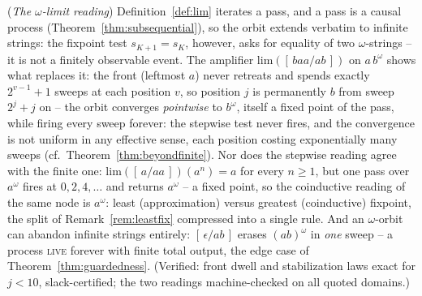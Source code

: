 
\begin{remark}
    (\emph{The $\omega$-limit reading})
    \label{rem:omega}
    Definition~\ref{def:lim} iterates a pass, and a pass is a causal
    process (Theorem~\ref{thm:subsequential}), so the orbit extends
    verbatim to infinite strings: the fixpoint test $s_{K+1} = s_K$,
    however, asks for equality of two $\omega$-strings -- it is not a
    finitely observable event.  The amplifier
    $\mathrm{lim}([\,baa/ab\,])$ on $a\,b^{\omega}$ shows what replaces
    it: the front (leftmost $a$) never retreats and spends exactly
    $2^{v-1}+1$ sweeps at each position $v$, so position $j$ is
    permanently $b$ from sweep $2^{j}+j$ on -- the orbit converges
    \emph{pointwise} to $b^{\omega}$, itself a fixed point of the pass,
    while firing every sweep forever: the stepwise test never fires,
    and the convergence is not uniform in any effective sense, each
    position costing exponentially many sweeps
    (cf.~Theorem~\ref{thm:beyondfinite}).  Nor does the stepwise
    reading agree with the finite one:
    $\mathrm{lim}([\,a/aa\,])(a^{n}) = a$ for every $n \geq 1$, but one
    pass over $a^{\omega}$ fires at $0, 2, 4, \dots$ and returns
    $a^{\omega}$ -- a fixed point, so the coinductive reading of the
    same node is $a^{\omega}$: least (approximation) versus greatest
    (coinductive) fixpoint, the split of Remark~\ref{rem:leastfix}
    compressed into a single rule.  And an $\omega$-orbit can abandon
    infinite strings entirely: $[\,\epsilon/ab\,]$ erases $(ab)^{\omega}$
    in \emph{one} sweep -- a process \textsc{live} forever with finite
    total output, the edge case of Theorem~\ref{thm:guardedness}.
    (Verified: front dwell and stabilization laws exact for $j < 10$,
    slack-certified; the two readings machine-checked on all quoted
    domains.)
\end{remark}
